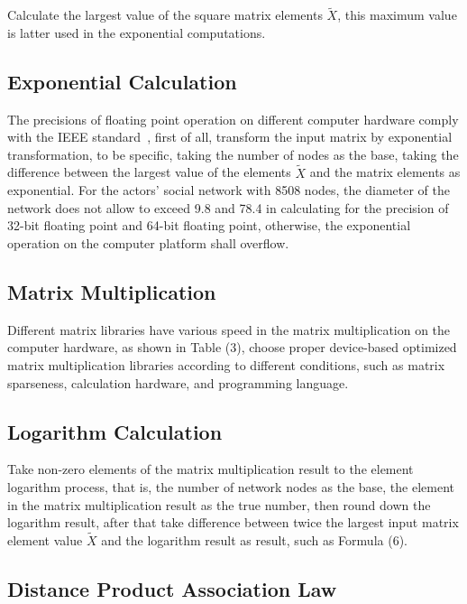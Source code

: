 \documentclass[review]{cvpr}
\begin{document}
Calculate the largest value of the square matrix elements $\widetilde X$,
this maximum value is latter used in the exponential computations.

\subsection{Exponential Calculation}

The precisions of floating point operation on different computer hardware comply with the IEEE standard~\cite{ieee1985ieee},
first of all, transform the input matrix by exponential transformation, to be specific, taking the number of nodes as the base,
taking the difference between the largest value of the elements $\widetilde X$ and the matrix elements as exponential.
For the actors' social network with 8508 nodes, the diameter of the network does not allow to exceed 9.8 and 78.4
in calculating for the precision of 32-bit floating point and 64-bit floating point,
otherwise, the exponential operation on the computer platform shall overflow.

\subsection{Matrix Multiplication}

Different matrix libraries have various speed in the matrix multiplication on the computer hardware, as shown in Table (3),
choose proper device-based optimized matrix multiplication libraries according to different conditions,
such as matrix sparseness, calculation hardware, and programming language.

\subsection{Logarithm Calculation}
Take non-zero elements of the matrix multiplication result to the element logarithm process, that is, the number of network nodes as the base, the element in the matrix multiplication result as the true number, then round down the logarithm result,
after that take difference between twice the largest input matrix element value $\widetilde X$ and the logarithm result as result, such as Formula (6).

\subsection{Distance Product Association Law}
\end{document}
